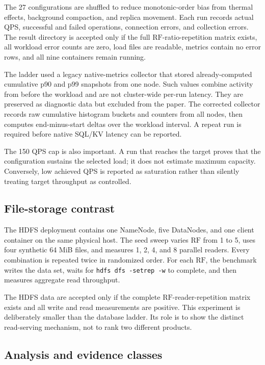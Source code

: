 \documentclass[a4paper,10pt,twocolumn]{article}
\newcommand{\rf}{\ensuremath{\mathrm{RF}}}
\newcommand{\hdfs}{HDFS}
\newcommand{\qps}{QPS}
\begin{document}
The 27 configurations are shuffled to reduce monotonic-order bias from thermal
effects, background compaction, and replica movement. Each run records actual
\qps{}, successful and failed operations, connection errors, and collection
errors. The result directory is accepted only if the full
\rf{}-ratio-repetition matrix exists, all workload error counts are zero, load
files are readable, metrics contain no error rows, and all nine containers
remain running.

The ladder used a legacy native-metrics collector that stored already-computed
cumulative p90 and p99 snapshots from one node. Such values combine activity
from before the workload and are not cluster-wide per-run latency. They are
preserved as diagnostic data but excluded from the paper. The corrected
collector records raw cumulative histogram buckets and counters from all
nodes, then computes end-minus-start deltas over the workload interval. A
repeat run is required before native SQL/KV latency can be reported.

The 150 \qps{} cap is also important. A run that reaches the target proves that
the configuration sustains the selected load; it does not estimate maximum
capacity. Conversely, low achieved \qps{} is reported as saturation rather
than silently treating target throughput as controlled.

\subsection{File-storage contrast}

The \hdfs{} deployment contains one NameNode, five DataNodes, and one client
container on the same physical host. The seed sweep varies \rf{} from 1 to 5,
uses four synthetic 64 MiB files, and measures 1, 2, 4, and 8 parallel readers.
Every combination is repeated twice in randomized order. For each \rf{}, the
benchmark writes the data set, waits for \texttt{hdfs dfs -setrep -w} to
complete, and then measures aggregate read throughput.

The \hdfs{} data are accepted only if the complete
\rf{}-reader-repetition matrix exists and all write and read measurements are
positive. This experiment is deliberately smaller than the database ladder.
Its role is to show the distinct read-serving mechanism, not to rank two
different products.

\subsection{Analysis and evidence classes}
\end{document}

